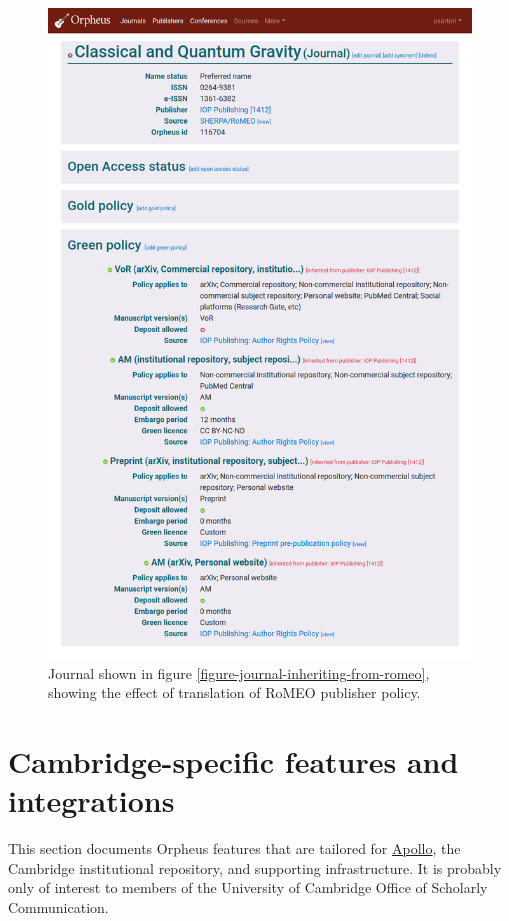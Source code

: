 \documentclass[british, 12pt]{article}
\begin{document}
\begin{figure}
  \includegraphics[width=\textwidth]{journal-inheriting-problematic-policies-from-romeo-after-translation}
  \caption{Journal shown in figure \vref{figure-journal-inheriting-from-romeo}, showing the effect of translation of RoMEO publisher policy.}
  \label{figure-journal-inheriting-from-romeo-after-translation}
\end{figure}


\section{Cambridge-specific features and integrations}

This section documents Orpheus features that are tailored for \href{https://www.repository.cam.ac.uk/}{Apollo}, the Cambridge institutional repository, and supporting infrastructure. It is probably only of interest to members of the University of Cambridge Office of Scholarly Communication.
\end{document}
